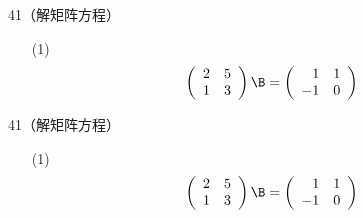 \begin{frame}
  \begin{footnotesize}
    \begin{exampleblock}{41（解矩阵方程）}
      \begin{itemize}
      \item[(1)]
        $$
        \left(
        \begin{array}{rr}
          2&5\\
          1&3
        \end{array}
        \right)\B=
        \left(
        \begin{array}{rr}
          1&1\\
          -1&0
        \end{array}
        \right)        
        $$
      \end{itemize}
    \end{exampleblock}
  \end{footnotesize}
\end{frame}


\begin{frame}
  \begin{footnotesize}
    \begin{exampleblock}{41（解矩阵方程）}
      \begin{itemize}
      \item[(1)]
        $$
        \left(
        \begin{array}{rr}
          2&5\\
          1&3
        \end{array}
        \right)\B=
        \left(
        \begin{array}{rr}
          1&1\\
          -1&0
        \end{array}
        \right)        
        $$
      \end{itemize}
    \end{exampleblock}
  \end{footnotesize}
\end{frame}



\begin{frame}
  \begin{footnotesize}
    \begin{exampleblock}{28}
      
    \end{exampleblock}
  \end{footnotesize}
\end{frame}


